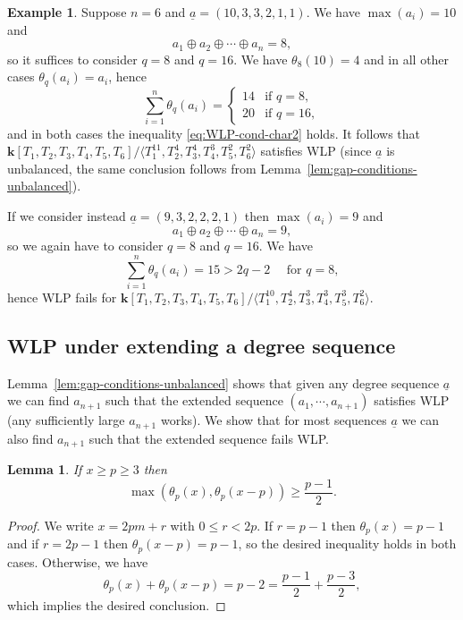 \documentclass[11pt,reqno]{amsart}
\def\kk{{\mathbf k}}
\newcommand{\ul}[1]{\underline{#1}}
\newtheorem{lemma}[theorem]{Lemma}
\theoremstyle{definition}
\newtheorem{example}[theorem]{Example}
\theoremstyle{remark}
\numberwithin{equation}{section}
\begin{document}
\begin{example}\label{ex:WLP-n=6}
    Suppose $n=6$ and $\ul{a}=(10, 3, 3, 2, 1, 1)$. We have $\max(a_i)=10$ and
    \[ a_1\oplus a_2\oplus\cdots\oplus a_n = 8,\]
    so it suffices to consider $q=8$ and $q=16$. We have $\theta_8(10) = 4$ and in all other cases $\theta_q(a_i)=a_i$, hence
    \[ \sum_{i=1}^n \theta_q(a_i) = \begin{cases}
        14 & \text{if }q = 8,\\
        20 & \text{if }q=16,
    \end{cases}\]
    and in both cases the inequality \eqref{eq:WLP-cond-char2} holds. It follows that
    $\kk[T_1,T_2,T_3,T_4,T_5,T_6]/\langle T_1^{11}, T_2^4, T_3^4, T_4^3, T_5^2, T_6^2\rangle$
    satisfies WLP (since $\ul{a}$ is unbalanced, the same conclusion follows from Lemma~\ref{lem:gap-conditions-unbalanced}). 
    
    If we consider instead $\ul{a}=(9, 3, 2, 2, 2, 1)$ then $\max(a_i)=9$ and 
    \[ a_1\oplus a_2\oplus\cdots\oplus a_n = 9,\]
    so we again have to consider $q=8$ and $q=16$. We have
    \[ \sum_{i=1}^n \theta_q(a_i) = 15 > 2q-2 \quad\text{ for }q=8,\]
    hence WLP fails for 
    $\kk[T_1,T_2,T_3,T_4,T_5,T_6]/\langle T_1^{10}, T_2^4, T_3^3, T_4^3, T_5^3, T_6^2\rangle$.
\end{example}


\subsection{WLP under extending a degree sequence}
\label{subsec:extend-seq}

Lemma~\ref{lem:gap-conditions-unbalanced} shows that given any degree sequence $\ul{a}$ we can find $a_{n+1}$ such that the extended sequence $(a_1,\cdots,a_{n+1})$ satisfies WLP (any sufficiently large $a_{n+1}$ works). We show that for most sequences $\ul{a}$ we can also find $a_{n+1}$ such that the extended sequence fails WLP.

\begin{lemma}\label{lem:large-thetap}
    If $x\geq p\geq 3$ then 
    \[\max\left(\theta_p(x),\theta_p(x-p)\right) \geq \frac{p-1}{2}.\]
\end{lemma}

\begin{proof} We write $x=2pm+r$ with $0\leq r<2p$. If $r=p-1$ then $\theta_p(x)=p-1$ and if $r=2p-1$ then $\theta_p(x-p)=p-1$, so the desired inequality holds in both cases. Otherwise, we have
\[\theta_p(x)+\theta_p(x-p) = p-2 = \frac{p-1}{2}+\frac{p-3}{2},\]
which implies the desired conclusion.    
\end{proof}
\end{document}
